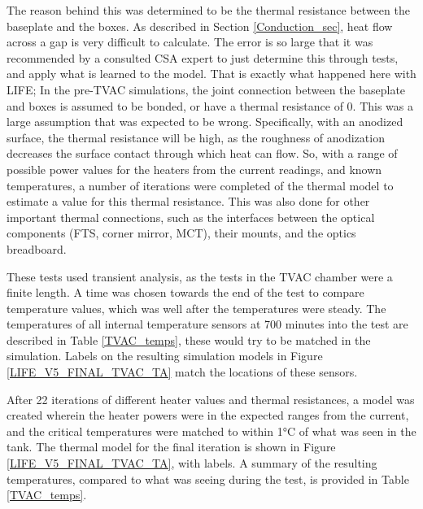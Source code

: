 The reason behind this was determined to be the thermal resistance between the baseplate and the boxes. As described in Section \ref{Conduction_sec}, heat flow across a gap is very difficult to calculate. The error is so large that it was recommended by a consulted CSA expert to just determine this through tests, and apply what is learned to the model. That is exactly what happened here with LIFE; In the pre-TVAC simulations, the joint connection between the baseplate and boxes is assumed to be bonded, or have a thermal resistance of 0. This was a large assumption that was expected to be wrong. Specifically, with an anodized surface, the thermal resistance will be high, as the roughness of anodization decreases the surface contact through which heat can flow. So, with a range of possible power values for the heaters from the current readings, and known temperatures, a number of iterations were completed of the thermal model to estimate a value for this thermal resistance. This was also done for other important thermal connections, such as the interfaces between the optical components (FTS, corner mirror, MCT), their mounts, and the optics breadboard.

These tests used transient analysis, as the tests in the TVAC chamber were a finite length. A time was chosen towards the end of the test to compare temperature values, which was well after the temperatures were steady. The temperatures of all internal temperature sensors at 700 minutes into the test are described in Table \ref{TVAC_temps}, these would try to be matched in the simulation. Labels on the resulting simulation models in Figure \ref{LIFE_V5_FINAL_TVAC_TA} match the locations of these sensors.

After 22 iterations of different heater values and thermal resistances, a model was created wherein the heater powers were in the expected ranges from the current, and the critical temperatures were matched to within 1°C of what was seen in the tank. The thermal model for the final iteration is shown in Figure \ref{LIFE_V5_FINAL_TVAC_TA}, with labels. A summary of the resulting temperatures, compared to what was seeing during the test, is provided in Table \ref{TVAC_temps}.

